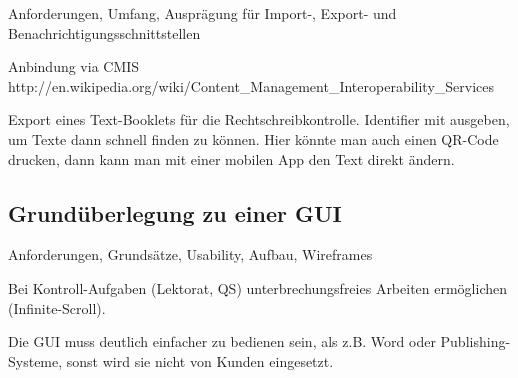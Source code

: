 Anforderungen, Umfang, Ausprägung für Import-, Export- und Benachrichtigungsschnittstellen

Anbindung via CMIS http://en.wikipedia.org/wiki/Content\_Management\_Interoperability\_Services

Export eines Text-Booklets für die Rechtschreibkontrolle. Identifier mit ausgeben, um Texte dann schnell finden zu können. Hier könnte man auch einen QR-Code drucken, dann kann man mit einer mobilen App den Text direkt ändern.

\subsection{Grundüberlegung zu einer GUI}

Anforderungen, Grundsätze, Usability, Aufbau, Wireframes

Bei Kontroll-Aufgaben (Lektorat, QS) unterbrechungsfreies Arbeiten ermöglichen (Infinite-Scroll).

Die GUI muss deutlich einfacher zu bedienen sein, als z.B. Word oder Publishing-Systeme, sonst wird sie nicht von Kunden eingesetzt.